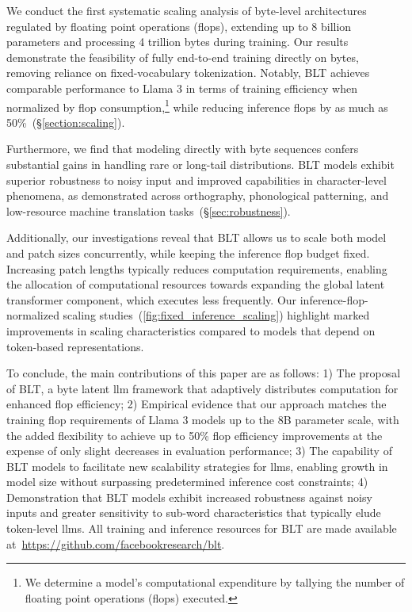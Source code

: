 We conduct the first systematic scaling analysis of byte-level architectures regulated by floating point operations (flops), extending up to 8 billion parameters and processing 4 trillion bytes during training. Our results demonstrate the feasibility of fully end-to-end training directly on bytes, removing reliance on fixed-vocabulary tokenization. Notably, {\textsc BLT} achieves comparable performance to Llama 3 in terms of training efficiency when normalized by flop consumption,\footnote{We determine a model’s computational expenditure by tallying the number of floating point operations (flops) executed.} while reducing inference flops by as much as 50\%~(\S\ref{section:scaling}).

Furthermore, we find that modeling directly with byte sequences confers substantial gains in handling rare or long-tail distributions. {\textsc BLT} models exhibit superior robustness to noisy input and improved capabilities in character-level phenomena, as demonstrated across orthography, phonological patterning, and low-resource machine translation tasks~(\S\ref{sec:robustness}).

Additionally, our investigations reveal that {\textsc BLT} allows us to scale both model and patch sizes concurrently, while keeping the inference flop budget fixed. Increasing patch lengths typically reduces computation requirements, enabling the allocation of computational resources towards expanding the global latent transformer component, which executes less frequently. Our inference-flop-normalized scaling studies~(\autoref{fig:fixed_inference_scaling}) highlight marked improvements in scaling characteristics compared to models that depend on token-based representations.

To conclude, the main contributions of this paper are as follows: 1) The proposal of {\textsc BLT}, a byte latent llm framework that adaptively distributes computation for enhanced flop efficiency; 2) Empirical evidence that our approach matches the training flop requirements of Llama 3 models up to the 8B parameter scale, with the added flexibility to achieve up to 50\% flop efficiency improvements at the expense of only slight decreases in evaluation performance; 3) The capability of {\textsc BLT} models to facilitate new scalability strategies for llms, enabling growth in model size without surpassing predetermined inference cost constraints; 4) Demonstration that {\textsc BLT} models exhibit increased robustness against noisy inputs and greater sensitivity to sub-word characteristics that typically elude token-level llms. All training and inference resources for {\textsc BLT} are made available at~\url{https://github.com/facebookresearch/blt}.

